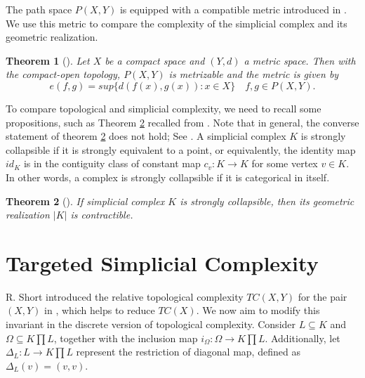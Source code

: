 \documentclass[preprint,11pt %
]{hjm1}
\newtheorem{theorem}{Theorem}[section]
\theoremstyle{definition}
\begin{document}
The path space $P(X,Y)$ is equipped with a compatible metric introduced in \cite{Int}. We use this metric to compare the complexity of the simplicial complex and its geometric realization.  


\begin{theorem}[\cite{Int}]\label{Int}
Let $X$ be a compact space and $(Y,d)$ a metric space. Then with the compact-open topology, $ P(X,Y)$ is metrizable and the metric  is given by 
\[
e(f,g)=sup \lbrace  d(f(x),g(x)):x\in X \rbrace \quad f,g\in P(X,Y).
\] 
\end{theorem}


To compare topological and simplicial complexity, we need to recall some propositions, such as Theorem \ref{j} recalled from \cite[Proposition 6.14]{com}. Note that in general, the converse statement of theorem \ref{j} does not hold; See \cite[Section 6.5]{com}. A simplicial complex $K$ is strongly collapsible if it is strongly equivalent to a point, or equivalently, the identity map $id_K$ is in the contiguity class of constant map $c_v: K\to K$ for some vertex $v \in K$. In other words, a complex is strongly collapsible if it is categorical in itself.


\begin{theorem}[\cite{com}]\label{j}
If simplicial complex $K$ is strongly collapsible, then its geometric realization $|K|$ is contractible.
\end{theorem}




\section{Targeted Simplicial Complexity}


R. Short introduced the relative topological complexity $TC(X,Y)$ for the pair $(X,Y)$ in \cite{rel}, which helps  to reduce $TC(X)$. We now aim to modify this invariant in the discrete version of topological complexity.
Consider $L\subseteq K$ and $\Omega \subseteq K\prod L$, together with the inclusion map $i_\Omega: \Omega \to K\prod L$. Additionally, let $\Delta_L: L \to K\prod L$ represent the restriction of  diagonal map, defined as $\Delta_L(v) = (v,v)$.
\end{document}

